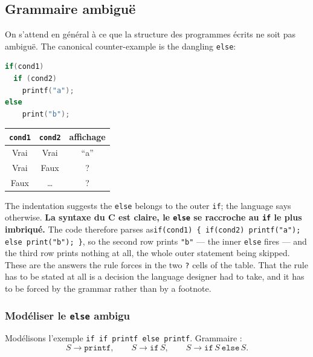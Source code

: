 \subsection{Grammaire ambiguë}

On s'attend en général à ce que la structure des programmes écrits ne soit pas
ambiguë. The canonical counter-example is the dangling \verb|else|:

\begin{lstlisting}[language=C]
if(cond1)
  if (cond2)
    printf("a");
else
    print("b");
\end{lstlisting}

\begin{center}
  \begin{tabular}{c c c}
    \toprule
    \verb|cond1| & \verb|cond2| & affichage \\
    \midrule
    Vrai  & Vrai  & ``a'' \\
    Vrai  & Faux  & ? \\
    Faux  & \dots & ? \\
    \bottomrule
  \end{tabular}
\end{center}

\noindent The indentation suggests the \verb|else| belongs to the outer
\verb|if|; the language says otherwise. \textbf{La syntaxe du C est claire, le
\texttt{else} se raccroche au \texttt{if} le plus imbriqué.} The code therefore
parses as\newline \verb|if(cond1) { if(cond2) printf("a"); else print("b"); }|, so the
second row prints \verb|"b"| --- the inner \verb|else| fires --- and the third row
prints nothing at all, the whole outer statement being skipped. These are the
answers the rule forces in the two \verb|?| cells of the table. That the rule
has to be stated at all is a decision
the language designer had to take, and it has to be forced by the grammar rather
than by a footnote.

\subsubsection{Modéliser le \texttt{else} ambigu}
Modélisons l'exemple \verb|if if printf else printf|. Grammaire :
\[
  S \to \texttt{printf}, \qquad
  S \to \texttt{if}\, S, \qquad
  S \to \texttt{if}\, S\ \texttt{else}\, S .
\]

